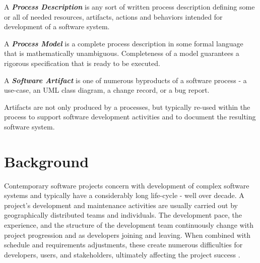 \begin{defn}\label{def_process_desc}
A \textbf{\textit{Process Description}} is any sort of written process description defining 
some or all of needed resources, artifacts, actions and behaviors intended for development 
of a software system.
\end{defn}


\begin{defn}\label{def_process_model}
A \textbf{\textit{Process Model}} is a complete process description in some formal language 
that is mathematically unambiguous. Completeness of a model guarantees a rigorous specification
that is ready to be executed.
\end{defn}

\begin{defn}\label{def_artifact}
A \textbf{\textit{Software Artifact}} is one of numerous byproducts of a software process - a use-case, 
an UML class diagram, a change record, or a bug report. 
\end{defn}
Artifacts are not only produced by a processes, but typically re-used within the process to support 
software development activities and to document the resulting software system.

%
%
\section{Background}\label{sec_background}
Contemporary software projects concern with development of complex software systems and typically have 
a considerably long life-cycle - well over decade.
A project's development and maintenance activities are usually carried out by geographically 
distributed teams and individuals. The development pace, the experience, and the structure of the 
development team continuously change with project progression and as developers joining and leaving. 
When combined with schedule and requirements adjustments, these create numerous difficulties 
for developers, users, and stakeholders, ultimately affecting the project success \cite{citeulike:2207657}. 

